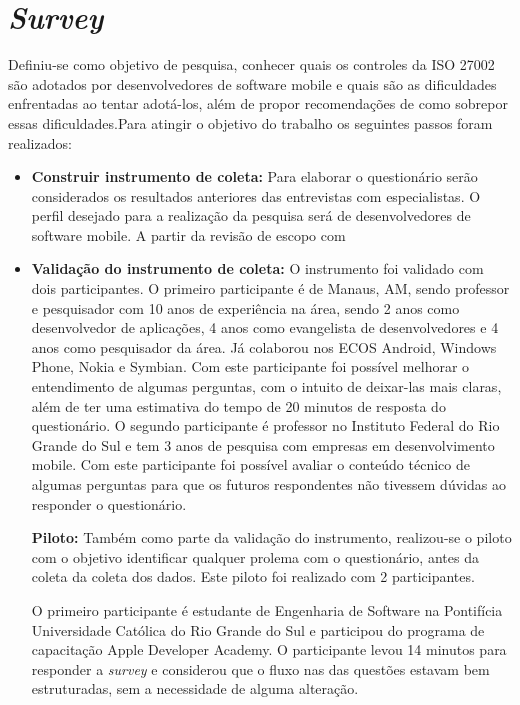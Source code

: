 \section{\textbf{\textit{Survey}}} Definiu-se como objetivo de pesquisa, conhecer quais os controles da ISO 27002 são adotados por desenvolvedores de software mobile e quais são as dificuldades enfrentadas ao tentar adotá-los, além de propor recomendações de como sobrepor essas dificuldades.Para atingir o objetivo do trabalho os seguintes passos foram realizados:
\begin{itemize}

\item \textbf{Construir instrumento de coleta:} Para elaborar o questionário serão considerados os resultados anteriores das entrevistas com especialistas. O perfil desejado para a realização da pesquisa será de desenvolvedores de software mobile. A partir da revisão de escopo com 

\item \textbf{Validação do instrumento de coleta:} O instrumento foi validado com dois participantes. O primeiro participante é de Manaus, AM, sendo professor e pesquisador com 10 anos de experiência na área, sendo 2 anos como desenvolvedor de aplicações, 4 anos como evangelista de desenvolvedores e 4 anos como pesquisador da área. Já colaborou nos ECOS Android, Windows Phone, Nokia e Symbian. Com este participante foi possível  melhorar o entendimento de algumas perguntas, com o intuito de deixar-las mais claras, além de ter uma estimativa do tempo de 20 minutos de resposta do questionário. O segundo participante é professor no Instituto Federal do Rio Grande do Sul e tem 3 anos de pesquisa com empresas em desenvolvimento mobile. Com este participante foi possível avaliar o conteúdo técnico de algumas perguntas para que os futuros respondentes não tivessem dúvidas ao responder o questionário.



 \textbf{Piloto:} Também como parte da validação do instrumento, realizou-se o piloto com o objetivo identificar qualquer prolema com o questionário, antes da coleta da coleta dos dados. Este piloto foi realizado com 2 participantes. 
 
 O primeiro participante é estudante de Engenharia de Software na Pontifícia Universidade Católica do Rio Grande do Sul e participou do programa de capacitação Apple Developer Academy. O participante levou  14 minutos para responder a \textit{survey} e considerou que o fluxo nas das questões estavam bem estruturadas, sem a necessidade de alguma alteração.
 

\end{itemize}
